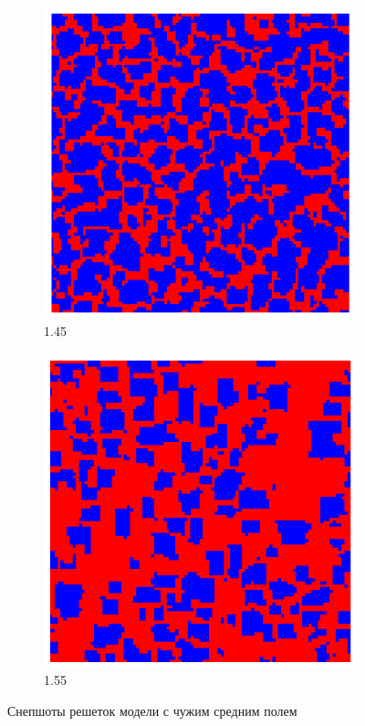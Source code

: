 \documentclass[a4paper]{article}
\begin{document}
\begin{figure}
	\begin{subfigure}{.5\textwidth}
		\includegraphics[width=.8\linewidth]{1.45-1.55-1.png}
		\caption{1.45}
	\end{subfigure}
	\begin{subfigure}{.5\textwidth}
		\includegraphics[width=.8\linewidth]{1.45-1.55-2.png}
		\caption{1.55}
	\end{subfigure}%
	\caption{Снепшоты решеток модели с чужим средним полем}
	\end{figure}		
\end{document}
